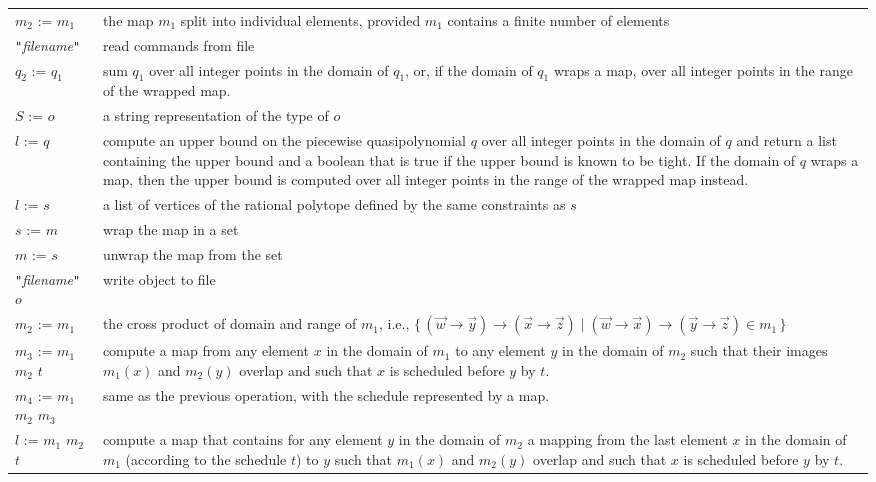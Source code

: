 \begin{supertabular}{p{0.35\textwidth}p{0.6\textwidth}}
$m_2$ :=  $m_1$ &
the map $m_1$ split into individual elements,
provided $m_1$ contains a finite number of elements
\\
 {\tt "}{\it filename}{\tt"} &
read commands from file
\\
$q_2$ :=  $q_1$ &
sum $q_1$ over all integer points in the domain of $q_1$,
or, if the domain of $q_1$ wraps a map, over all integer
points in the range of the wrapped map.
\\
$S$ :=  $o$ &
a string representation of the type of $o$
\\
$l$ :=  $q$ &
compute an
upper bound on the piecewise quasipolynomial $q$ over
all integer points in the domain of $q$
and return a list containing the upper bound
and a boolean that is true if the upper bound
is known to be tight.
If the domain of $q$ wraps a map, then the upper
bound is computed over all integer points in
the range of the wrapped map instead.
\\
$l$ :=  $s$ &
a list of vertices of the rational polytope defined by the same constraints
as $s$
\\
$s$ :=  $m$ &
wrap the map in a set
\\
$m$ :=  $s$ &
unwrap the map from the set
\\
 {\tt "}{\it filename}{\tt"} $o$ &
write object to file
\\
$m_2$ :=  $m_1$ &
the cross product of domain and range of $m_1$, i.e.,
$\{\, (\vec w \to \vec y) \to (\vec x \to \vec z)
\mid (\vec w \to \vec x) \to (\vec y \to \vec z) \in m_1 \,\}$
\\
$m_3$ :=  $m_1$  $m_2$  $t$ &
compute a map from any element $x$ in the domain of $m_1$
to any element $y$ in the domain of $m_2$
such that their images $m_1(x)$ and $m_2(y)$ overlap
and such that $x$ is scheduled before $y$ by $t$.
\\
$m_4$ :=  $m_1$  $m_2$  $m_3$ &
same as the previous operation, with the schedule represented by a map.
\\
$l$ :=  $m_1$  $m_2$  $t$ &
compute a map that contains for any element $y$ in the domain of $m_2$
a mapping from the last element $x$ in the domain of $m_1$
(according to the schedule $t$) to $y$
such that $m_1(x)$ and $m_2(y)$ overlap
and such that $x$ is scheduled before $y$ by $t$.

\end{supertabular}
